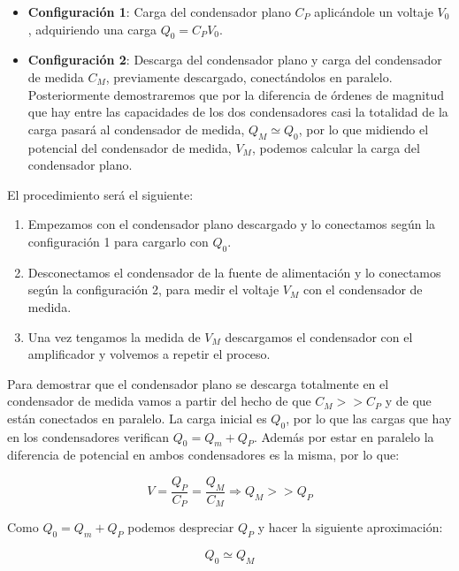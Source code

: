 \documentclass[a4paper,12pt,titlepage]{article}
\begin{document}
\begin{itemize}
    \item \textbf{Configuración 1}: Carga del condensador plano $C_P$ aplicándole un voltaje $V_0$, adquiriendo una carga $Q_0=C_PV_0$.
    \item \textbf{Configuración 2}: Descarga del condensador plano y carga del condensador de medida $C_M$, previamente descargado, conectándolos en paralelo. Posteriormente demostraremos que por la diferencia de órdenes de magnitud que hay entre las capacidades de los dos condensadores casi la totalidad de la carga pasará al condensador de medida, $Q_M \simeq Q_0$, por lo que midiendo el potencial del condensador de medida, $V_M$, podemos calcular la carga del condensador plano.
\end{itemize}

\newpage

El procedimiento será el siguiente:

\begin{enumerate}
    \item Empezamos con el condensador plano descargado y lo conectamos según la configuración 1 para cargarlo con $Q_0$.
    \item Desconectamos el condensador de la fuente de alimentación y lo conectamos según la configuración 2, para medir el voltaje $V_M$ con el condensador de medida.
    \item Una vez tengamos la medida de $V_M$ descargamos el condensador con el amplificador y volvemos a repetir el proceso.
\end{enumerate}

Para demostrar que el condensador plano se descarga totalmente en el condensador de medida vamos a partir del hecho de que $C_M >> C_P$ y de que están conectados en paralelo. La carga inicial es $Q_0$, por lo que las cargas que hay en los condensadores verifican $Q_0=Q_m + Q_P$. Además por estar en paralelo la diferencia de potencial en ambos condensadores es la misma, por lo que:

\begin{equation}
    V = \frac{Q_P}{C_P} = \frac{Q_M}{C_M} \Rightarrow Q_M >> Q_P
\end{equation}

Como $Q_0=Q_m + Q_P$ podemos despreciar $Q_P$ y hacer la siguiente aproximación:

\begin{equation}
    Q_0 \simeq Q_M
\end{equation}
\end{document}
